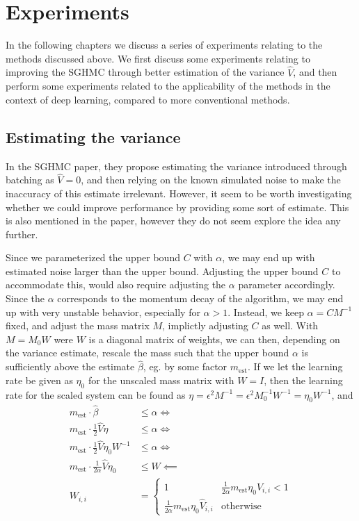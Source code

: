 \chapter{Experiments}

In the following chapters we discuss a series of experiments relating to the methods discussed above. 
We first discuss some experiments relating to improving the SGHMC through better estimation of the variance $\hat{V}$, and then perform some experiments related to the applicability of the methods in the context of deep learning, compared to more conventional methods.

\section{Estimating the variance}

In the SGHMC paper, they propose estimating the variance introduced through batching as $\hat{V}=0$, and then relying on the known simulated noise to make the inaccuracy of this estimate irrelevant. 
However, it seem to be worth investigating whether we could improve performance by providing some sort of estimate. 
This is also mentioned in the paper, however they do not seem explore the idea any further. 

Since we parameterized the upper bound $C$ with $\alpha$, we may end up with estimated noise larger than the upper bound.
Adjusting the upper bound $C$ to accommodate this, would also require adjusting the $\alpha$ parameter accordingly.
Since the $\alpha$ corresponds to the momentum decay of the algorithm, we may end up with very unstable behavior, especially for $\alpha > 1$. 
Instead, we keep $\alpha=CM^{-1}$ fixed, and adjust the mass matrix $M$, implictly adjusting $C$ as well.
With $M = M_0 W$ were $W$ is a diagonal matrix of weights, we can then, depending on the variance estimate, rescale the mass such that the upper bound $\alpha$ is sufficiently above the estimate $\hat\beta$, eg. by some factor $m_{\text{est}}$.
If we let the learning rate be given as $\eta_0$  for the unscaled mass matrix with $W = I$, then the learning rate for the scaled system can be found as $\eta = \epsilon^2 M^{-1} = \epsilon^2 M_0^{-1}W^{-1} = \eta_0 W^{-1}$, and
\begin{align*}
    m_{\text{est}} \cdot \hat{\beta}  &\leq \alpha \Leftrightarrow\\ 
    m_{\text{est}} \cdot \frac{1}{2} \hat V \eta   &\leq \alpha \Leftrightarrow\\ 
    m_{\text{est}} \cdot \frac{1}{2} \hat V \eta_0 W^{-1}  &\leq \alpha \Leftrightarrow\\ 
    m_{\text{est}} \cdot \frac{1}{2\alpha} \hat V \eta_0   &\leq W \impliedby \\
    W_{i,i} &= \begin{cases}
        1 & \frac{1}{2\alpha}m_{\text{est}} \eta_0 \hat{V}_{i,i} < 1 \\
        \frac{1}{2\alpha}m_{\text{est}} \eta_0 \hat{V}_{i,i} & \text{otherwise}
    \end{cases}
\end{align*}

